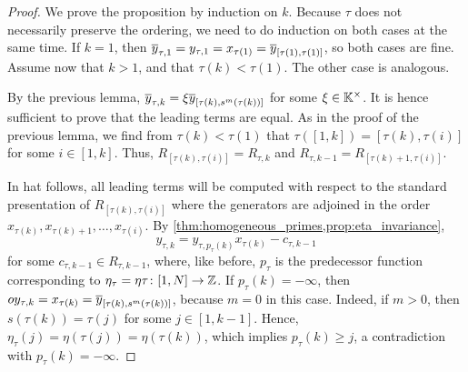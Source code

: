 \begin{proof}
	We prove the proposition by induction on $k$. Because $\tau$ does not necessarily preserve the ordering, we need to do induction on both cases at the same time. If $k=1$, then $\overline{y}_{\tau, 1} = y_{\tau, 1} = x_{\tau(1)} = \overline{y}_{[\tau(1), \tau(1)]}$, so both cases are fine. Assume now that $k > 1$, and that $\tau(k) < \tau(1)$. The other case is analogous.

	By the previous lemma, $\overline{y}_{\tau, k} = \xi \overline{y}_{[\tau(k), s^m(\tau(k))]}$ for some
	$\xi \in \mathbb{K}^\times$. It is hence sufficient to prove that the leading terms are
	equal. As in the proof of the previous lemma, we find from $\tau(k) < \tau(1)$ that
	$\tau([1, k]) = [\tau(k), \tau(i)]$ for some $i \in [1, k]$. Thus, $R_{[\tau(k),
						\tau(i)]} = R_{\tau, k}$ and $R_{\tau, k-1} = R_{[\tau(k) + 1, \tau(i)]}$.

	In hat follows, all leading terms will be computed with respect to the standard
	presentation of $R_{[\tau(k), \tau(i)]}$ where the generators are adjoined in the order
	$x_{\tau(k)}, x_{\tau(k) + 1}, \dots, x_{\tau(i)}$. By
	\cref{thm:homogeneous_primes,prop:eta_invariance},
	\begin{equation*}
		y_{\tau, k} = y_{\tau, p_{\tau}(k)}x_{\tau(k)} - c_{\tau, k-1}
	\end{equation*}
	for some $c_{\tau, k-1} \in R_{\tau, k-1}$, where, like before, $p_\tau$ is the
	predecessor function corresponding to $\eta_\tau = \eta \tau \colon [1, N] \to \mathbb{Z}$.
	If $p_\tau(k) = -\infty$, then $oy_{\tau, k} = x_{\tau(k)} = \overline{y}_{[\tau(k),
					s^m(\tau(k))]}$, because $m = 0$ in this case. Indeed, if $m>0$, then $s(\tau(k)) =
		\tau(j)$ for some $j \in [1, k-1]$. Hence, $\eta_\tau(j) = \eta(\tau(j)) =
		\eta(\tau(k))$, which implies $p_\tau(k) \geq j$, a contradiction with $p_\tau(k) =
		-\infty$.


\end{proof}
